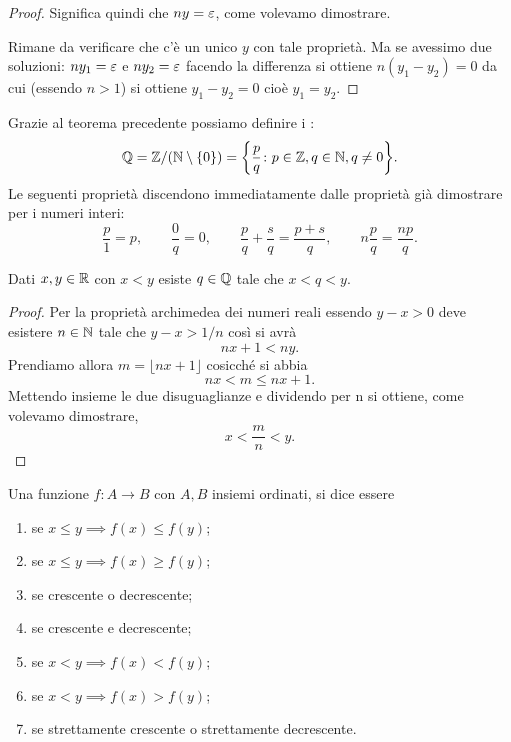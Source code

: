 \begin{proof}
  Significa quindi che $ny = \varepsilon$, come volevamo dimostrare.

  Rimane da verificare che c'è un unico $y$ con tale proprietà. 
  Ma se avessimo due soluzioni: $ny_1 = \varepsilon$ e $ny_2 = \varepsilon$ facendo la differenza 
  si ottiene $n(y_1-y_2)=0$ da cui (essendo $n>1$) si ottiene $y_1-y_2=0$ cioè $y_1=y_2$. 
\end{proof}

Grazie al teorema precedente possiamo definire i :
\[
\mathbb Q = \mathbb Z / (\mathbb N\setminus{\left\{ 0 \right\}}) = {\left\{ \frac{p}{q}\colon p\in \mathbb Z, q\in \mathbb N, q\neq 0 \right\}}.
\]
Le seguenti proprietà discendono immediatamente dalle proprietà già dimostrare 
per i numeri interi:
\[
  \frac{p}{1} = p, \qquad 
  \frac{0}{q} = 0, \qquad
  \frac{p}{q} + \frac{s}{q} = \frac{p+s}{q},\qquad 
  n \frac{p}{q} = \frac{np}{q}.
\]

\begin{theorem}[densità di $\QQ$ in $\RR$]
\label{th:densita_Q}%
\mymark{*}%
%
Dati $x,y \in \mathbb R$ con $x<y$ esiste $q\in \mathbb Q$ tale che $x<q<y$.
\end{theorem}
%
\begin{proof}
Per la proprietà archimedea dei numeri reali essendo $y-x>0$
deve esistere $n\in \mathbb N$ tale che $y-x > 1/n$ così si avrà
\[
    nx + 1 < ny.
\]
Prendiamo allora $m=\lfloor nx + 1\rfloor$ cosicché si abbia
\[
  nx < m \le nx + 1.
\]
Mettendo insieme le due disuguaglianze e dividendo per n si ottiene,
come volevamo dimostrare,
\[
  x < \frac{m}{n} < y.
\]
\end{proof}

\begin{definition}
  \label{def:monotonia}%
  \mymark{***}%
  Una funzione $f\colon A \to B$ con $A,B$ insiemi ordinati, si
  dice essere
  \begin{enumerate}
  \item {} se $x \le y \implies f(x) \le f(y)$;
  \item {} se $x \le y \implies f(x) \ge f(y)$;
  \item {} se crescente o decrescente;
  \item {} se crescente e decrescente;
  \item {} se $x<y \implies f(x) < f(y)$;
  \item {} se $x<y \implies f(x) > f(y)$;
  \item {} se strettamente crescente o strettamente decrescente.
  \end{enumerate}
  \end{definition}
  
